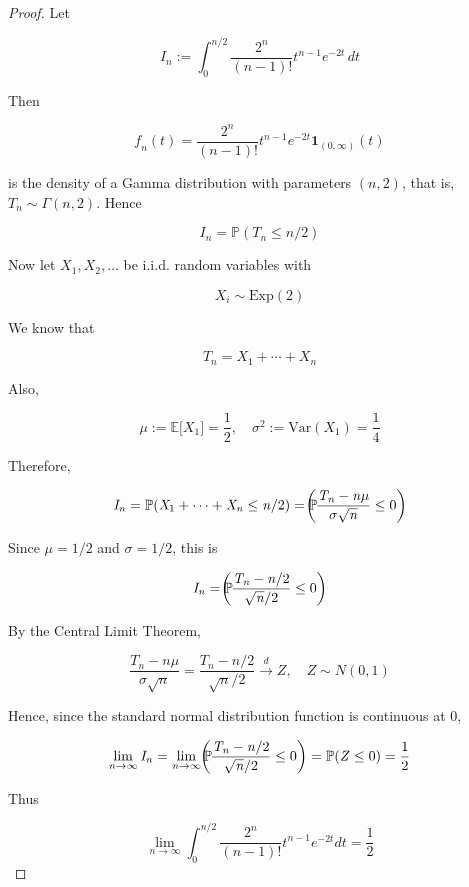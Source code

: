 \begin{proof}

Let

\[\mathit{I}_{\mathit{n}} := \int_{0}^{\mathit{n}/2}\frac{2^{\mathit{n}}}{(\mathit{n} - 1)!}\mathit{t}^{\mathit{n} - 1}\mathit{e}^{- 2\mathit{t}}\,\mathit{d}\mathit{t}\]

Then

\[\mathit{f}_{\mathit{n}}(\mathit{t}) = \frac{2^{\mathit{n}}}{(\mathit{n} - 1)!}\mathit{t}^{\mathit{n} - 1}\mathit{e}^{- 2\mathit{t}}\mathbf{1}_{(0,\infty)}(\mathit{t})\]

is the density of a Gamma distribution with parameters \((\mathit{n},2)\), that is, \(\mathit{T}_{\mathit{n}} \sim \Gamma(\mathit{n},2)\). Hence

\[\mathit{I}_{\mathit{n}} = \mathbb{P}(\mathit{T}_{\mathit{n}} \leq \mathit{n}/2)\]

Now let \(\mathit{X}_{1},\mathit{X}_{2},\ldots\) be i.i.d. random variables with

\[\mathit{X}_{\mathit{i}} \sim \text{Exp}(2)\]

We know that

\[\mathit{T}_{\mathit{n}} = \mathit{X}_{1} + \cdots + \mathit{X}_{\mathit{n}}\]

Also,

\[\mathit{\mu} := \mathbb{E}\lbrack\mathit{X}_{1}\rbrack = \frac{1}{2},\quad\mathit{\sigma}^{2} := \text{Var}(\mathit{X}_{1}) = \frac{1}{4}\]

Therefore,

\[\mathit{I}_{\mathit{n}} = \mathbb{P}(\mathit{X}_{1} + \cdots + \mathit{X}_{\mathit{n}} \leq \mathit{n}/2) = \mathbb{P}\mspace{-18mu}\left( {\frac{\mathit{T}_{\mathit{n}} - \mathit{n}\mathit{\mu}}{\mathit{\sigma}\sqrt{\mathit{n}}} \leq 0} \right)\]

Since \(\mathit{\mu} = 1/2\) and \(\mathit{\sigma} = 1/2\), this is

\[\mathit{I}_{\mathit{n}} = \mathbb{P}\mspace{-18mu}\left( {\frac{\mathit{T}_{\mathit{n}} - \mathit{n}/2}{\sqrt{\mathit{n}}/2} \leq 0} \right)\]

By the Central Limit Theorem,

\[\frac{\mathit{T}_{\mathit{n}} - \mathit{n}\mathit{\mu}}{\mathit{\sigma}\sqrt{\mathit{n}}} = \frac{\mathit{T}_{\mathit{n}} - \mathit{n}/2}{\sqrt{\mathit{n}}/2}\overset{\mathit{d}}{\rightarrow}\mathit{Z},\quad\mathit{Z} \sim \mathit{N}(0,1)\]

Hence, since the standard normal distribution function is continuous at \(0\),

\[\lim\limits_{\mathit{n}\rightarrow\infty}\mathit{I}_{\mathit{n}} = \lim\limits_{\mathit{n}\rightarrow\infty}\mathbb{P}\mspace{-18mu}\left( {\frac{\mathit{T}_{\mathit{n}} - \mathit{n}/2}{\sqrt{\mathit{n}}/2} \leq 0} \right) = \mathbb{P}(\mathit{Z} \leq 0) = \frac{1}{2}\]

Thus

\[\lim\limits_{\mathit{n}\rightarrow\infty}\int_{0}^{\mathit{n}/2}\frac{2^{\mathit{n}}}{(\mathit{n} - 1)!}\mathit{t}^{\mathit{n} - 1}\mathit{e}^{- 2\mathit{t}}\mathit{d}\mathit{t} = \frac{1}{2}\]

\end{proof}

